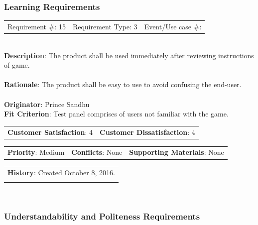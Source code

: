 \documentclass[12pt, titlepage]{article}
\begin{document}
\subsubsection{Learning Requirements}

\begin{reqbox}

\begin{tabular}{lll}
Requirement \#: 15 & Requirement Type: 3 & Event/Use case \#: \\
\end{tabular} \\

\textbf{Description}: The product shall be used immediately after reviewing instructions of game. \\ \\
\textbf{Rationale}: The product shall be easy to use to avoid confusing the end-user. \\ \\
\textbf{Originator}: Prince Sandhu \\
\textbf{Fit Criterion}: Test panel comprises of users not familiar with the game. \\

\begin{tabular}{ll}
\textbf{Customer Satisfaction}: 4 & \textbf{Customer Dissatisfaction}: 4 \\
\end{tabular}

\begin{tabular}{lll}
\textbf{Priority}: Medium & \textbf{Conflicts}: None & \textbf{Supporting Materials}: None \\
\end{tabular}

\begin{tabular}{l}
\textbf{History}: Created October 8, 2016.\\ \\
\end{tabular} \\

\end{reqbox}
\subsubsection{Understandability and Politeness Requirements}
\end{document}
